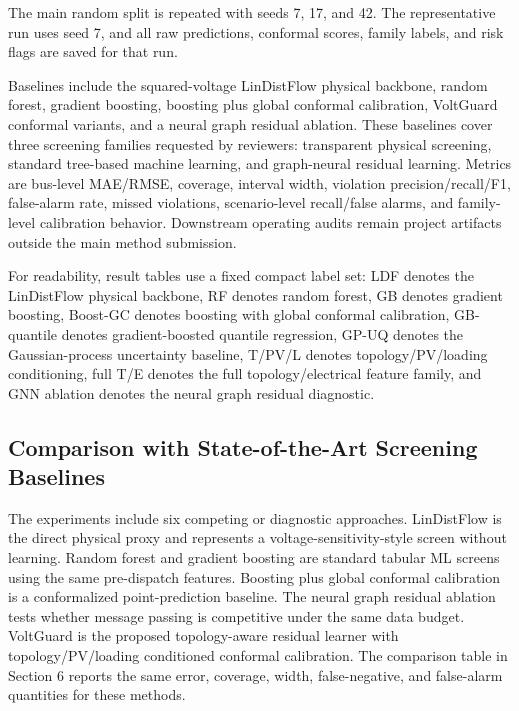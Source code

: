 \documentclass[
  preprint,12pt]{elsarticle}
\begin{document}
The main random split is repeated with seeds 7, 17, and 42. The
representative run uses seed 7, and all raw predictions, conformal
scores, family labels, and risk flags are saved for that run.

Baselines include the squared-voltage LinDistFlow physical backbone,
random forest, gradient boosting, boosting plus global conformal
calibration, VoltGuard conformal variants, and a neural graph residual
ablation. These baselines cover three screening families requested by
reviewers: transparent physical screening, standard tree-based machine
learning, and graph-neural residual learning. Metrics are bus-level
MAE/RMSE, coverage, interval width, violation precision/recall/F1,
false-alarm rate, missed violations, scenario-level recall/false alarms,
and family-level calibration behavior. Downstream operating audits
remain project artifacts outside the main method submission.

For readability, result tables use a fixed compact label set: LDF
denotes the LinDistFlow physical backbone, RF denotes random forest, GB
denotes gradient boosting, Boost-GC denotes boosting with global
conformal calibration, GB-quantile denotes gradient-boosted quantile
regression, GP-UQ denotes the Gaussian-process uncertainty baseline,
T/PV/L denotes topology/PV/loading conditioning, full T/E denotes the
full topology/electrical feature family, and GNN ablation denotes the
neural graph residual diagnostic.

\subsection{Comparison with State-of-the-Art Screening
Baselines}\label{comparison-with-state-of-the-art-screening-baselines}

The experiments include six competing or diagnostic approaches.
LinDistFlow is the direct physical proxy and represents a
voltage-sensitivity-style screen without learning. Random forest and
gradient boosting are standard tabular ML screens using the same
pre-dispatch features. Boosting plus global conformal calibration is a
conformalized point-prediction baseline. The neural graph residual
ablation tests whether message passing is competitive under the same
data budget. VoltGuard is the proposed topology-aware residual learner
with topology/PV/loading conditioned conformal calibration. The
comparison table in Section 6 reports the same error, coverage, width,
false-negative, and false-alarm quantities for these methods.
\end{document}
